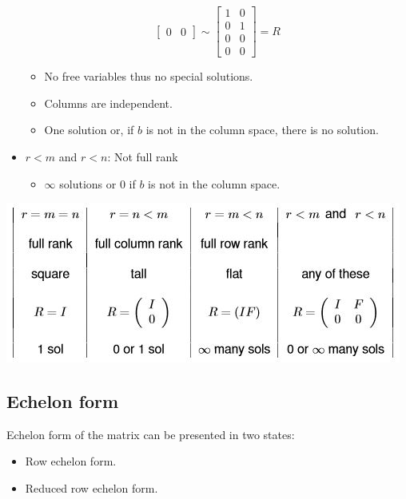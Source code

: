 \documentclass[10pt,a4paper]{article}
\begin{document}
\begin{itemize}
$$\begin{bmatrix}
        0 & 0
        \end{bmatrix} \sim
        \begin{bmatrix}
        1 & 0\\ 
        0 & 1\\ 
        0 & 0\\ 
        0 & 0
        \end{bmatrix} = R$$
    \begin{itemize}
        \item No free variables thus no special solutions.
        \item Columns are independent.
        \item One solution or, if $b$ is not in the column space, there is no solution.
    \end{itemize}
    \item $r<m$ and $r<n$: Not full rank
    \begin{itemize}
        \item $\infty$ solutions or $0$ if $b$ is not in the column space.
    \end{itemize}
\end{itemize}
\begin{tcolorbox}[breakable,colback=white]
    \centering
    \includegraphics[scale=0.8]{Summary.JPG}
\end{tcolorbox}

\subsection{Echelon form}

Echelon form of the matrix can be presented in two states:
\begin{itemize}
    \item Row echelon form.
    \item Reduced row echelon form.
\end{itemize}
\end{document}
